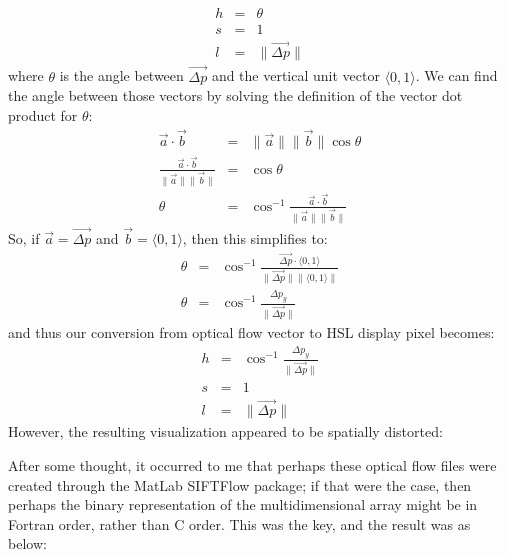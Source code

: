 \begin{eqnarray*}
    h & = & \theta \\
    s & = & 1 \\
    l & = & \lVert \vec{\Delta p} \rVert
\end{eqnarray*}
where $\theta$ is the angle between $\vec{\Delta p}$ and the vertical unit vector $\langle 0,1 \rangle$. We can find the angle between those vectors by solving the definition of the vector dot product for $\theta$:
\begin{eqnarray*}
    \vec{a} \cdot \vec{b} & = & \lVert\vec{a}\rVert \lVert\vec{b}\rVert \cos\theta \\
    \frac{ \vec{a} \cdot \vec{b}}{\lVert\vec{a}\rVert \lVert\vec{b}\rVert} & = & \cos\theta \\
    \theta & = & \cos ^{-1} \frac{ \vec{a} \cdot \vec{b}}{\lVert \vec{a}\rVert \lVert \vec{b}\rVert}
\end{eqnarray*}
So, if $\vec{a} = \vec{\Delta p}$ and $\vec{b} = \langle 0,1 \rangle$, then this simplifies to:
\begin{eqnarray*}
    \theta & = & \cos ^{-1} \frac{ \vec{\Delta p} \cdot \langle 0,1 \rangle}{\lVert \vec{\Delta p} \rVert \lVert \langle 0,1 \rangle \rVert} \\
    \theta & = & \cos ^{-1} \frac{ {\Delta p}_y }{\lVert \vec{\Delta p} \rVert}
\end{eqnarray*}
and thus our conversion from optical flow vector to HSL display pixel becomes:
\begin{eqnarray*}
    h & = & \cos ^{-1} \frac{ {\Delta p}_y }{\lVert \vec{\Delta p} \rVert} \\
    s & = & 1 \\
    l & = & \lVert \vec{\Delta p} \rVert
\end{eqnarray*}
However, the resulting visualization appeared to be spatially distorted:\par
After some thought, it occurred to me that perhaps these optical flow files were created through the MatLab SIFTFlow package; if that were the case, then perhaps the binary representation of the multidimensional array might be in Fortran order, rather than C order. This was the key, and the result was as below:

